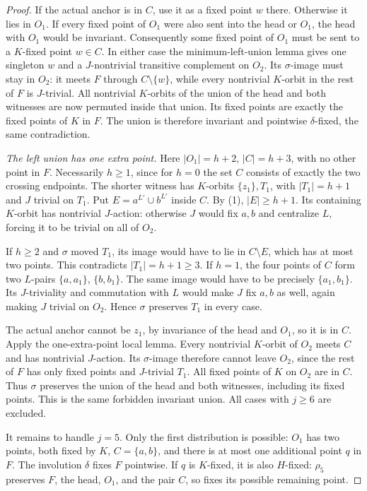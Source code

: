 \documentclass[11pt,a4paper]{article}
\begin{document}
\begin{proof}
If the actual anchor is in $C$, use it as a
fixed point $w$ there. Otherwise it lies in
$O_1$. If every fixed point of $O_1$ were
also sent into the head or $O_1$, the head
with $O_1$ would be invariant. Consequently
some fixed point of $O_1$ must be sent to a
$K$-fixed point $w\in C$. In either case
the minimum-left-union lemma gives one
singleton $w$ and a $J$-nontrivial transitive
complement on $O_2$. Its $\sigma$-image
must stay in $O_2$: it meets $F$ through
$C\setminus\{w\}$, while every nontrivial
$K$-orbit in the rest of $F$ is $J$-trivial.
All nontrivial $K$-orbits of the union of
the head and both witnesses are now permuted
inside that union. Its fixed points are
exactly the fixed points of $K$ in $F$.
The union is therefore invariant and
pointwise $\delta$-fixed, the same contradiction.

\emph{The left union has one extra point.}
Here $|O_1|=h+2$, $|C|=h+3$, with no other
point in $F$. Necessarily $h\ge1$, since
for $h=0$ the set $C$ consists of exactly
the two crossing endpoints. The shorter
witness has $K$-orbits $\{z_1\},T_1$, with
$|T_1|=h+1$ and $J$ trivial on $T_1$.
Put $E=a^{L'}\cup b^{L'}$ inside $C$.
By (1), $|E|\ge h+1$. Its containing
$K$-orbit has nontrivial $J$-action: otherwise
$J$ would fix $a,b$ and centralize $L$,
forcing it to be trivial on all of $O_2$.

If $h\ge2$ and $\sigma$ moved $T_1$,
its image would have to lie in $C\setminus E$,
which has at most two points. This contradicts
$|T_1|=h+1\ge3$. If $h=1$, the four points
of $C$ form two $L$-pairs $\{a,a_1\}$,
$\{b,b_1\}$. The same image would have to
be precisely $\{a_1,b_1\}$. Its $J$-triviality
and commutation with $L$ would make $J$
fix $a,b$ as well, again making $J$ trivial
on $O_2$. Hence $\sigma$ preserves $T_1$
in every case.

The actual anchor cannot be $z_1$, by
invariance of the head and $O_1$, so it is
in $C$. Apply the one-extra-point local
lemma. Every nontrivial $K$-orbit of $O_2$
meets $C$ and has nontrivial $J$-action.
Its $\sigma$-image therefore cannot leave
$O_2$, since the rest of $F$ has only fixed
points and $J$-trivial $T_1$. All fixed
points of $K$ on $O_2$ are in $C$. Thus
$\sigma$ preserves the union of the head
and both witnesses, including its fixed
points. This is the same forbidden invariant
union. All cases with $j\ge6$ are excluded.

It remains to handle $j=5$. Only the first
distribution is possible: $O_1$ has two
points, both fixed by $K$, $C=\{a,b\}$,
and there is at most one additional point
$q$ in $F$. The involution $\delta$ fixes
$F$ pointwise. If $q$ is $K$-fixed, it is
also $H$-fixed: $\rho_5$ preserves $F$,
the head, $O_1$, and the pair $C$, so fixes
its possible remaining point.


\end{proof}
\end{document}

